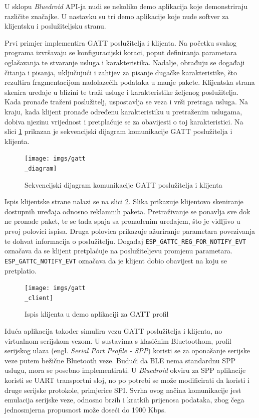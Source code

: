 U sklopu \textit{Bluedroid} API-ja nudi se nekoliko demo aplikacija koje demonstriraju različite značajke. U nastavku su tri demo aplikacije koje nude softver za klijentsku i poslužiteljsku stranu. 

Prvi primjer implementira GATT poslužitelja i klijenta. Na početku svakog programa izvršavaju se konfiguracijski koraci, poput definiranja parametara oglašavanja te stvaranje usluga i karakteristika. Nadalje, obrađuju se događaji čitanja i pisanja, uključujući i zahtjev za pisanje dugačke karakteristike, što rezultira fragmentacijom nadolazećih podataka u manje pakete. Klijentska strana skenira uređaje u blizini te traži usluge i karakteristike željenog poslužitelja. Kada pronađe traženi poslužitelj, uspostavlja se veza i vrši pretraga usluga. Na kraju, kada klijent pronađe određenu karakteristiku u pretraženim uslugama, dobiva njezinu vrijednost i pretplaćuje se za obavijesti o toj karakteristici. Na slici \ref{fig:gatt_diagram} prikazan je sekvencijski dijagram komunikacije GATT poslužitelja i klijenta.

\begin{figure}[ht]
	\centering
	\texttt{[image: imgs/gatt\\\_diagram]}
	\caption{Sekvencijski dijagram komunikacije GATT poslužitelja i klijenta \cite{esp_bt_api}}
	\label{fig:gatt_diagram}
\end{figure}

Ispis klijentske strane nalazi se na slici \ref{fig:gatt_client}. Slika prikazuje klijentovo skeniranje dostupnih uređaja odnosno reklamnih paketa. Pretraživanje se ponavlja sve dok ne pronađe paket, te se tada spaja sa pronađenim uređajem, što je vidljivo u prvoj polovici ispisa. Druga polovica prikazuje ažuriranje parametara povezivanja te dohvat informacija o poslužitelju. Događaj \texttt{ESP\_GATTC\_REG\_FOR\_NOTIFY\_EVT} označava da se klijent pretplaćuje na poslužiteljevu promjenu parametara. \texttt{ESP\_GATTC\_NOTIFY\_EVT} označava da je klijent dobio obavijest na koju se pretplatio. 

\begin{figure}[ht]
	\centering
	\texttt{[image: imgs/gatt\\\_client]}
	\caption{Ispis klijenta u demo aplikaciji za GATT profil}
	\label{fig:gatt_client}
\end{figure}

Iduća aplikacija također simulira vezu GATT poslužitelja i klijenta, no virtualnom serijskom vezom. U sustavima s klasičnim Bluetoothom, profil serijskog ulaza (engl. \textit{Serial Port Profile - SPP}) koristi se za oponašanje serijske veze putem bežične Bluetooth veze. Budući da BLE nema standardnu SPP uslugu, mora se posebno implementirati. U \textit{Bluedroid} okviru za SPP aplikacije koristi se UART transportni sloj, no po potrebi se može modificirati da koristi i druge serijske protokole, primjerice SPI. Svrha ovog načina komunikacije jest emulacija serijske veze, odnosno brzih i kratkih prijenosa podataka, zbog čega jednosmjerna propusnost može doseći do 1900 Kbps.

